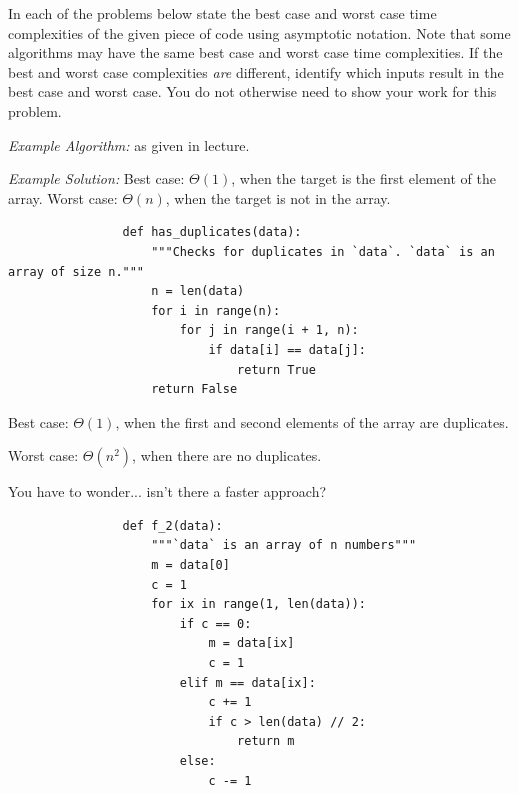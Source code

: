\begin{prob}
    In each of the problems below state the best case and worst case time
    complexities of the given piece of code using asymptotic notation. Note that
    some algorithms may have the same best case and worst case time complexities. If
    the best and worst case complexities \emph{are} different, identify which
    inputs result in the best case and worst case. You do not otherwise need to show your work for
    this problem.

    \emph{Example Algorithm:}  as given in lecture. 

    \emph{Example Solution:}
    Best case: $\Theta(1)$, when the target is the first element of the array.
    Worst case: $\Theta(n)$, when the target is not in the array.

    \begin{subprobset}
        \begin{subprob}
            \begin{verbatim}
                def has_duplicates(data):
                    """Checks for duplicates in `data`. `data` is an array of size n."""
                    n = len(data)
                    for i in range(n):
                        for j in range(i + 1, n):
                            if data[i] == data[j]:
                                return True
                    return False
            \end{verbatim}

            \begin{soln}
                Best case: $\Theta(1)$, when the first and second elements of the array
                are duplicates.

                Worst case: $\Theta(n^2)$, when there are no duplicates.

                You have to wonder... isn't there a faster approach?
            \end{soln}
        \end{subprob}

        \begin{subprob}
            \begin{verbatim}
                def f_2(data):
                    """`data` is an array of n numbers"""
                    m = data[0]
                    c = 1
                    for ix in range(1, len(data)):
                        if c == 0:
                            m = data[ix]
                            c = 1
                        elif m == data[ix]:
                            c += 1
                            if c > len(data) // 2:
                                return m
                        else:
                            c -= 1


\end{verbatim}
\end{subprob}
\end{subprobset}
\end{prob}
